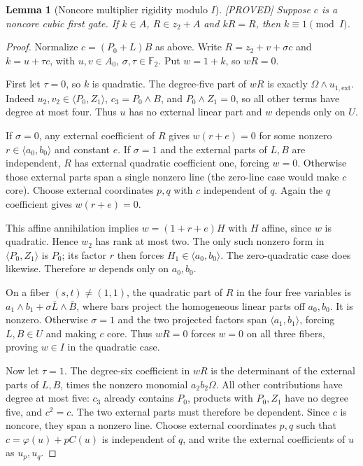 \documentclass[11pt,a4paper]{article}
\newtheorem{lemma}[theorem]{Lemma}
\newcommand{\status}[1]{\hfill\textsf{[#1]}}
\begin{document}
\begin{lemma}[Noncore multiplier rigidity modulo $I$]\label{lem:noncoremult}\status{PROVED}
Suppose $c$ is a noncore cubic first gate. If $k\in A$, $R\in z_2+A$ and $kR=R$, then $k\equiv1\pmod I$.
\end{lemma}
\begin{proof}
Normalize $c=(P_0+L)B$ as above. Write $R=z_2+v+\sigma c$ and $k=u+\tau c$, with $u,v\in A_0$, $\sigma,\tau\in\mathbb F_2$. Put $w=1+k$, so $wR=0$.

First let $\tau=0$, so $k$ is quadratic. The degree-five part of $wR$ is exactly $\Omega\wedge u_{1,\mathrm{ext}}$. Indeed $u_2,v_2\in\langle P_0,Z_1\rangle$, $c_3=P_0\wedge B$, and $P_0\wedge Z_1=0$, so all other terms have degree at most four. Thus $u$ has no external linear part and $w$ depends only on $U$.

If $\sigma=0$, any external coefficient of $R$ gives $w(r+e)=0$ for some nonzero $r\in\langle a_0,b_0\rangle$ and constant $e$. If $\sigma=1$ and the external parts of $L,B$ are independent, $R$ has external quadratic coefficient one, forcing $w=0$. Otherwise those external parts span a single nonzero line (the zero-line case would make $c$ core). Choose external coordinates $p,q$ with $c$ independent of $q$. Again the $q$ coefficient gives $w(r+e)=0$.

This affine annihilation implies $w=(1+r+e)H$ with $H$ affine, since $w$ is quadratic. Hence $w_2$ has rank at most two. The only such nonzero form in $\langle P_0,Z_1\rangle$ is $P_0$; its factor $r$ then forces $H_1\in\langle a_0,b_0\rangle$. The zero-quadratic case does likewise. Therefore $w$ depends only on $a_0,b_0$.

On a fiber $(s,t)\ne(1,1)$, the quadratic part of $R$ in the four free variables is $a_1\wedge b_1+\sigma\bar L\wedge\bar B$, where bars project the homogeneous linear parts off $a_0,b_0$. It is nonzero. Otherwise $\sigma=1$ and the two projected factors span $\langle a_1,b_1\rangle$, forcing $L,B\in U$ and making $c$ core. Thus $wR=0$ forces $w=0$ on all three fibers, proving $w\in I$ in the quadratic case.

Now let $\tau=1$. The degree-six coefficient in $wR$ is the determinant of the external parts of $L,B$, times the nonzero monomial $a_2b_2\Omega$. All other contributions have degree at most five: $c_3$ already contains $P_0$, products with $P_0,Z_1$ have no degree five, and $c^2=c$. The two external parts must therefore be dependent. Since $c$ is noncore, they span a nonzero line. Choose external coordinates $p,q$ such that $c=\varphi(u)+pC(u)$ is independent of $q$, and write the external coefficients of $u$ as $u_p,u_q$.


\end{proof}
\end{document}

